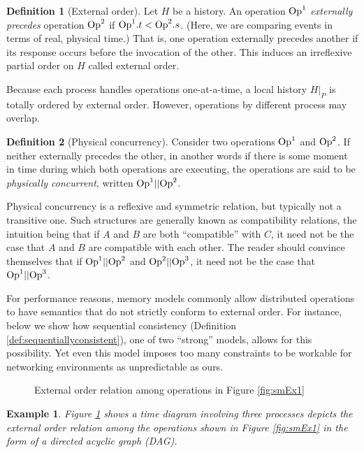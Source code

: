 \documentclass[]             %
{NASA}                       %
\newtheorem{example}{Example}
\theoremstyle{definition}
\newtheorem{definition}{Definition}[section]
\begin{document}
\begin{definition}[External order]
  Let $H$ be a history. An operation $\mathrm{Op}^1$ \emph{externally
    precedes} operation $\mathrm{Op}^2$ if $\mathrm{Op}^1.t < \mathrm{Op}^2.s$. (Here, we are
  comparing events in terms of real, physical time.) That is, one
  operation externally precedes another if its response occurs before
  the invocation of the other. This induces an irreflexive partial
  order on $H$ called external order.
\end{definition}

Because each process handles operations one-at-a-time, a local history
$H|_P$ is totally ordered by external order. However, operations by
different process may overlap.

\begin{definition}[Physical concurrency]
  Consider two operations $\mathrm{Op}^1$ and $\mathrm{Op}^2$. If neither externally
  precedes the other, in another words if there is some moment in time
  during which both operations are executing, the operations are said
  to be \emph{physically concurrent}, written $\mathrm{Op}^1 || \mathrm{Op}^2$.
\end{definition}

Physical concurrency is a reflexive and symmetric relation, but
typically not a transitive one. Such structures are generally known as
compatibility relations, the intuition being that if \(A\) and \(B\) are
both ``compatible'' with \(C\), it need not be the case that \(A\) and
\(B\) are compatible with each other. The reader should convince
themselves that if $\mathrm{Op}^1 || \mathrm{Op}^2$ and $\mathrm{Op}^2 || \mathrm{Op}^3$, it need not
be the case that $\mathrm{Op}^1 || \mathrm{Op}^3$.

For performance reasons, memory models commonly allow distributed
operations to have semantics that do not strictly conform to external
order. For instance, below we show how sequential consistency
(Definition \ref{def:sequentiallyconsistent}), one of two ``strong''
models, allows for this possibility. Yet even this model imposes too
many constraints to be workable for networking environments as
unpredictable as ours.

\begin{figure}[h]
    \centering
    
    \caption{External order relation among operations in Figure \ref{fig:smEx1}}
    \label{fig:smEx1DAG}
  \end{figure}

\begin{example}
  Figure \ref{fig:smEx1DAG} shows a time diagram involving three
  processes depicts the external order relation among the operations
  shown in Figure \ref{fig:smEx1} in the form of a directed acyclic
  graph (DAG).
\end{example}
\end{document}
